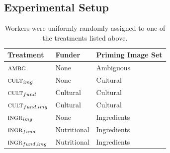 \documentclass[a4paper]{report}
\begin{document}
\subsection*{Experimental Setup}
\begin{table}[t]
\centering
	\begin{tabular}{ l  l  l }
		\hline                       
		Treatment & Funder & Priming Image Set	\\ 
		\hline                       
		$\textsc{ambg}$ & None & Ambiguous\\
		$\textsc{cult}_{img}$ & None & Cultural\\
		$\textsc{cult}_{fund}$ & Cultural & Cultural\\
		$\textsc{cult}_{fund,img}$ & Cultural & Cultural\\
		$\textsc{ingr}_{img}$ & None & Ingredients\\
		$\textsc{ingr}_{fund}$ & Nutritional & Ingredients\\
		$\textsc{ingr}_{fund, img}$ & Nutritional & Ingredients\\
		\hline  
	\end{tabular}


	\caption{Workers were uniformly randomly
		assigned to one of the treatments listed above.}
	\label{table:1}
\end{table}
\end{document}
